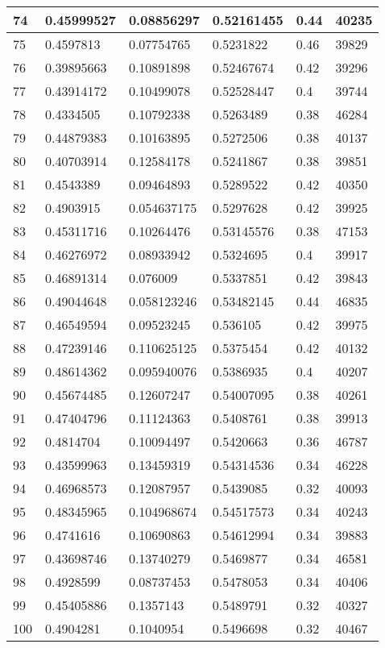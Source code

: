 \begin{longtable}{|l|l|l|l|l|l|}
74 & 0.45999527 & 0.08856297 & 0.52161455 & 0.44 & 40235 \\ \hline 
75 & 0.4597813 & 0.07754765 & 0.5231822 & 0.46 & 39829 \\ \hline 
76 & 0.39895663 & 0.10891898 & 0.52467674 & 0.42 & 39296 \\ \hline 
77 & 0.43914172 & 0.10499078 & 0.52528447 & 0.4 & 39744 \\ \hline 
78 & 0.4334505 & 0.10792338 & 0.5263489 & 0.38 & 46284 \\ \hline 
79 & 0.44879383 & 0.10163895 & 0.5272506 & 0.38 & 40137 \\ \hline 
80 & 0.40703914 & 0.12584178 & 0.5241867 & 0.38 & 39851 \\ \hline 
81 & 0.4543389 & 0.09464893 & 0.5289522 & 0.42 & 40350 \\ \hline 
82 & 0.4903915 & 0.054637175 & 0.5297628 & 0.42 & 39925 \\ \hline 
83 & 0.45311716 & 0.10264476 & 0.53145576 & 0.38 & 47153 \\ \hline 
84 & 0.46276972 & 0.08933942 & 0.5324695 & 0.4 & 39917 \\ \hline 
85 & 0.46891314 & 0.076009 & 0.5337851 & 0.42 & 39843 \\ \hline 
86 & 0.49044648 & 0.058123246 & 0.53482145 & 0.44 & 46835 \\ \hline 
87 & 0.46549594 & 0.09523245 & 0.536105 & 0.42 & 39975 \\ \hline 
88 & 0.47239146 & 0.110625125 & 0.5375454 & 0.42 & 40132 \\ \hline 
89 & 0.48614362 & 0.095940076 & 0.5386935 & 0.4 & 40207 \\ \hline 
90 & 0.45674485 & 0.12607247 & 0.54007095 & 0.38 & 40261 \\ \hline 
91 & 0.47404796 & 0.11124363 & 0.5408761 & 0.38 & 39913 \\ \hline 
92 & 0.4814704 & 0.10094497 & 0.5420663 & 0.36 & 46787 \\ \hline 
93 & 0.43599963 & 0.13459319 & 0.54314536 & 0.34 & 46228 \\ \hline 
94 & 0.46968573 & 0.12087957 & 0.5439085 & 0.32 & 40093 \\ \hline 
95 & 0.48345965 & 0.104968674 & 0.54517573 & 0.34 & 40243 \\ \hline 
96 & 0.4741616 & 0.10690863 & 0.54612994 & 0.34 & 39883 \\ \hline 
97 & 0.43698746 & 0.13740279 & 0.5469877 & 0.34 & 46581 \\ \hline 
98 & 0.4928599 & 0.08737453 & 0.5478053 & 0.34 & 40406 \\ \hline 
99 & 0.45405886 & 0.1357143 & 0.5489791 & 0.32 & 40327 \\ \hline 
100 & 0.4904281 & 0.1040954 & 0.5496698 & 0.32 & 40467 \\ \hline 
\end{longtable}